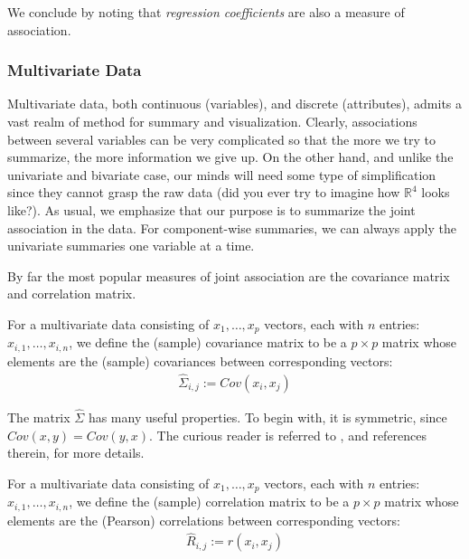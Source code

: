 \documentclass[12pt,a4paper]{report}
\begin{document}
We conclude by noting that \emph{regression coefficients} are also a measure of association. 





\subsubsection{Multivariate Data}
Multivariate data, both continuous (variables), and discrete (attributes), admits a vast realm of method for summary and visualization.
Clearly, associations between several variables can be very complicated so that the more we try to summarize, the more information we give up. On the other hand, and unlike the univariate and bivariate case, our minds will need some type of simplification since they cannot grasp the raw data (did you ever try to imagine how $\mathbb{R}^4$ looks like?).
As usual, we emphasize that our purpose is to summarize the joint association in the data. 
For component-wise summaries, we can always apply the univariate summaries one variable at a time. 

By far the most popular measures of joint association are the covariance matrix and correlation matrix.

\begin{definition}
For a multivariate data consisting of $x_1,\dots,x_p$ vectors, each with $n$ entries: $x_{i,1},\dots,x_{i,n}$, we define the (sample) covariance matrix to be a $p\times p$ matrix whose elements are the (sample) covariances between corresponding vectors:
\begin{align}
	\hat{\Sigma}_{i,j}:= Cov(x_i, x_j)
\end{align}
\end{definition}


\begin{extra}
The matrix $\hat{\Sigma}$ has many useful properties. 
To begin with, it is symmetric, since $Cov(x,y)=Cov(y,x)$.
The curious reader is referred to \cite{petersen_matrix_2006}, and references therein, for more details.
\end{extra}

\begin{definition}
For a multivariate data consisting of $x_1,\dots,x_p$ vectors, each with $n$ entries: $x_{i,1},\dots,x_{i,n}$, we define the (sample) correlation matrix to be a $p\times p$ matrix whose elements are the (Pearson) correlations between corresponding vectors:
\begin{align}
	\hat{R}_{i,j}:= r(x_i, x_j)
\end{align}
\end{definition}
\end{document}
